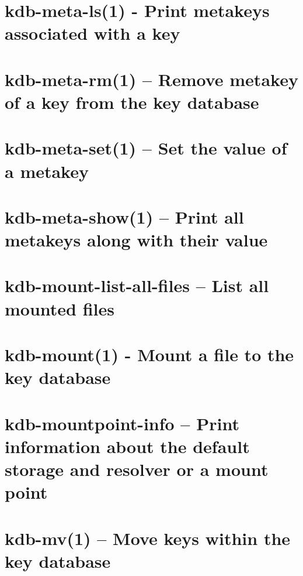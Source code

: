 \let\mypdfximage\pdfximage\def\pdfximage{\immediate\mypdfximage}\documentclass[twoside]{book}
\newcommand{\+}{\discretionary{\mbox{\scriptsize$\hookleftarrow$}}{}{}}
\begin{document}
\chapter{kdb-\/meta-\/ls(1) -\/ Print metakeys associated with a key}
\label{doc_help_kdb-meta-ls_md}

\chapter{kdb-\/meta-\/rm(1) -- Remove metakey of a key from the key database}
\label{doc_help_kdb-meta-rm_md}

\chapter{kdb-\/meta-\/set(1) -- Set the value of a metakey}
\label{doc_help_kdb-meta-set_md}

\chapter{kdb-\/meta-\/show(1) -- Print all metakeys along with their value}
\label{doc_help_kdb-meta-show_md}

\chapter{kdb-\/mount-\/list-\/all-\/files -- List all mounted files}
\label{doc_help_kdb-mount-list-all-files_md}

\chapter{kdb-\/mount(1) -\/ Mount a file to the key database}
\label{doc_help_kdb-mount_md}

\chapter{kdb-\/mountpoint-\/info -- Print information about the default storage and resolver or a mount point}
\label{doc_help_kdb-mountpoint-info_md}

\chapter{kdb-\/mv(1) -- Move keys within the key database}
\label{doc_help_kdb-mv_md}

\end{document}

